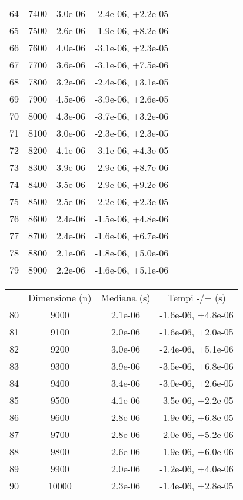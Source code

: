 \begin{table}
\begin{adjustbox}{width=1\textwidth/2}
\begin{tabular}{|c|c|c|c|}
\cline{1-4}
64 & 7400 & 3.0e-06 & -2.4e-06, +2.2e-05 \\
\cline{1-4}
65 & 7500 & 2.6e-06 & -1.9e-06, +8.2e-06 \\
\cline{1-4}
66 & 7600 & 4.0e-06 & -3.1e-06, +2.3e-05 \\
\cline{1-4}
67 & 7700 & 3.6e-06 & -3.1e-06, +7.5e-06 \\
\cline{1-4}
68 & 7800 & 3.2e-06 & -2.4e-06, +3.1e-05 \\
\cline{1-4}
69 & 7900 & 4.5e-06 & -3.9e-06, +2.6e-05 \\
\cline{1-4}
70 & 8000 & 4.3e-06 & -3.7e-06, +3.2e-06 \\
\cline{1-4}
71 & 8100 & 3.0e-06 & -2.3e-06, +2.3e-05 \\
\cline{1-4}
72 & 8200 & 4.1e-06 & -3.1e-06, +4.3e-05 \\
\cline{1-4}
73 & 8300 & 3.9e-06 & -2.9e-06, +8.7e-06 \\
\cline{1-4}
74 & 8400 & 3.5e-06 & -2.9e-06, +9.2e-06 \\
\cline{1-4}
75 & 8500 & 2.5e-06 & -2.2e-06, +2.3e-05 \\
\cline{1-4}
76 & 8600 & 2.4e-06 & -1.5e-06, +4.8e-06 \\
\cline{1-4}
77 & 8700 & 2.4e-06 & -1.6e-06, +6.7e-06 \\
\cline{1-4}
78 & 8800 & 2.1e-06 & -1.8e-06, +5.0e-06 \\
\cline{1-4}
79 & 8900 & 2.2e-06 & -1.6e-06, +5.1e-06 \\
\cline{1-4}
\end{tabular}
\end{adjustbox}
\end{table}

\begin{table}
\centering
\begin{adjustbox}{width=1\textwidth/2}
\begin{tabular}{|c|c|c|c|}
\hline
 & Dimensione (n) & Mediana (s) & Tempi -/+ (s) \\
80 & 9000 & 2.1e-06 & -1.6e-06, +4.8e-06 \\
\cline{1-4}
81 & 9100 & 2.0e-06 & -1.6e-06, +2.0e-05 \\
\cline{1-4}
82 & 9200 & 3.0e-06 & -2.4e-06, +5.1e-06 \\
\cline{1-4}
83 & 9300 & 3.9e-06 & -3.5e-06, +6.8e-06 \\
\cline{1-4}
84 & 9400 & 3.4e-06 & -3.0e-06, +2.6e-05 \\
\cline{1-4}
85 & 9500 & 4.1e-06 & -3.5e-06, +2.2e-05 \\
\cline{1-4}
86 & 9600 & 2.8e-06 & -1.9e-06, +6.8e-05 \\
\cline{1-4}
87 & 9700 & 2.8e-06 & -2.0e-06, +5.2e-06 \\
\cline{1-4}
88 & 9800 & 2.6e-06 & -1.9e-06, +6.0e-06 \\
\cline{1-4}
89 & 9900 & 2.0e-06 & -1.2e-06, +4.0e-06 \\
\cline{1-4}
90 & 10000 & 2.3e-06 & -1.4e-06, +2.8e-05 \\
\cline{1-4}
\end{tabular}
\end{adjustbox}
\end{table}
